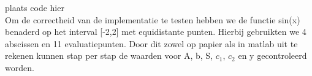 plaats code hier\\
Om de correctheid van de implementatie te testen hebben we de functie sin(x) benaderd op het interval [-2,2] met equidistante punten. Hierbij gebruikten we 4 abscissen en 11 evaluatiepunten. Door dit zowel op papier als in matlab uit te rekenen kunnen stap per stap de waarden voor A, b, S, $c_1$, $c_2$ en y gecontroleerd worden.